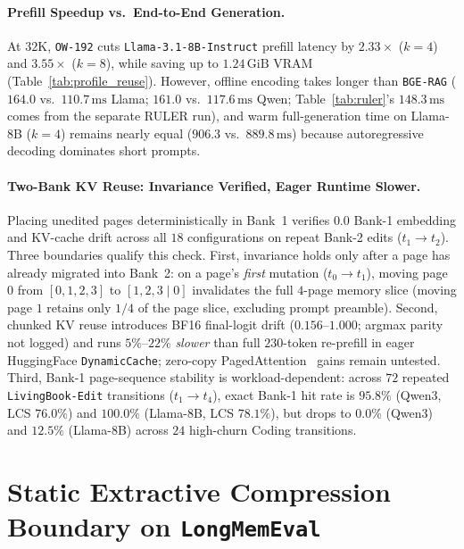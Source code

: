 \documentclass[11pt]{article}
\renewcommand{\_}{\origunderscore\allowbreak}
\begin{document}
\paragraph{Prefill Speedup vs.\ End-to-End Generation.}
At $32\text{K}$, \texttt{OW-192} cuts \texttt{Llama-3.1-8B-Instruct} prefill latency by $2.33\times$ ($k=4$) and $3.55\times$ ($k=8$), while saving up to $1.24\,\text{GiB}$ VRAM (Table~\ref{tab:profile_reuse}). However, offline encoding takes longer than \texttt{BGE-RAG} ($164.0$ vs.\ $110.7\,\text{ms}$ Llama; $161.0$ vs.\ $117.6\,\text{ms}$ Qwen; Table~\ref{tab:ruler}'s $148.3\,\text{ms}$ comes from the separate RULER run), and warm full-generation time on Llama-8B ($k=4$) remains nearly equal ($906.3$ vs.\ $889.8\,\text{ms}$) because autoregressive decoding dominates short prompts.

\paragraph{Two-Bank KV Reuse: Invariance Verified, Eager Runtime Slower.}
Placing unedited pages deterministically in Bank~1 verifies $0.0$ Bank-1 embedding and KV-cache drift across all $18$ configurations on repeat Bank-2 edits ($t_1 \rightarrow t_2$). Three boundaries qualify this check. First, invariance holds only after a page has already migrated into Bank~2: on a page's \emph{first} mutation ($t_0 \rightarrow t_1$), moving page $0$ from $[0,1,2,3]$ to $[1,2,3 \mid 0]$ invalidates the full $4$-page memory slice (moving page $1$ retains only $1/4$ of the page slice, excluding prompt preamble). Second, chunked KV reuse introduces BF16 final-logit drift ($0.156$--$1.000$; argmax parity not logged) and runs $5\%$--$22\%$ \emph{slower} than full $230$-token re-prefill in eager HuggingFace \texttt{DynamicCache}; zero-copy PagedAttention~\cite{kwon2023vllm,zheng2024sglang} gains remain untested. Third, Bank-1 page-sequence stability is workload-dependent: across $72$ repeated \texttt{LivingBook-Edit} transitions ($t_1 \rightarrow t_4$), exact Bank-1 hit rate is $95.8\%$ (Qwen3, LCS $76.0\%$) and $100.0\%$ (Llama-8B, LCS $78.1\%$), but drops to $0.0\%$ (Qwen3) and $12.5\%$ (Llama-8B) across $24$ high-churn Coding transitions.

\section{Static Extractive Compression Boundary on \texttt{LongMemEval}}
\label{sec:lme}
\end{document}
